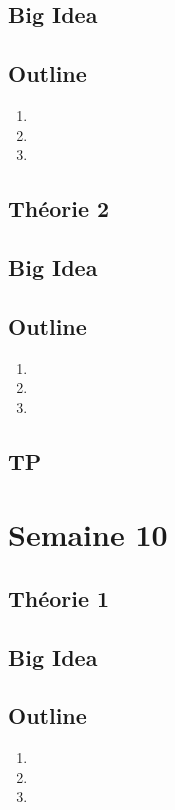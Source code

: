 \documentclass{article}
\begin{document}
\subsection*{Big Idea}
\subsection*{Outline}
    \begin{enumerate}
    \item
    \item
    \item
    \end{enumerate}
\subsection{Théorie 2}
\subsection*{Big Idea}
\subsection*{Outline}
    \begin{enumerate}
    \item
    \item
    \item
    \end{enumerate}
\subsection{TP}

\pagebreak
\section{Semaine 10}
\subsection{Théorie 1}
\subsection*{Big Idea}
\subsection*{Outline}
    \begin{enumerate}
    \item
    \item
    \item
    \end{enumerate}
\end{document}
